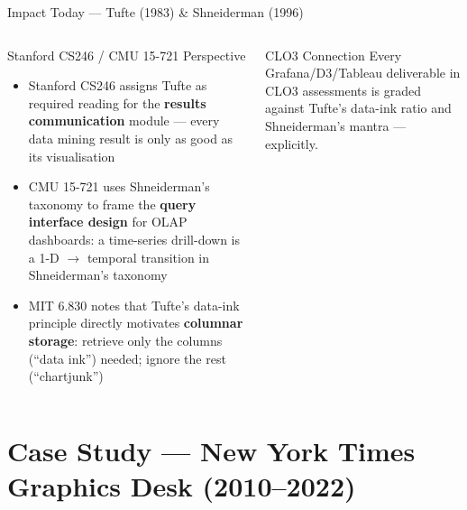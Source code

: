 \documentclass[aspectratio=169,10pt]{beamer}
\begin{document}
\begin{frame}{Impact Today — Tufte (1983) \& Shneiderman (1996)}
\begin{columns}[T]
      \begin{exampleblock}{Stanford CS246 / CMU 15-721 Perspective}
        \begin{itemize}
          \item Stanford CS246 assigns Tufte as required reading
                for the \textbf{results communication} module —
                every data mining result is only as good as its
                visualisation
          \item CMU 15-721 uses Shneiderman's taxonomy to frame the
                \textbf{query interface design} for OLAP dashboards:
                a time-series drill-down is a 1-D $\to$ temporal
                transition in Shneiderman's taxonomy
          \item MIT 6.830 notes that Tufte's data-ink principle
                directly motivates \textbf{columnar storage}:
                retrieve only the columns (``data ink'') needed;
                ignore the rest (``chartjunk'')
        \end{itemize}
      \end{exampleblock}
      \vspace{4pt}
      \begin{alertblock}{CLO3 Connection}
        Every Grafana/D3/Tableau deliverable in CLO3 assessments
        is graded against Tufte's data-ink ratio and Shneiderman's
        mantra — explicitly.
      \end{alertblock}
  \end{columns}
\end{frame}

\section{Case Study — New York Times Graphics Desk (2010--2022)}
\end{document}
